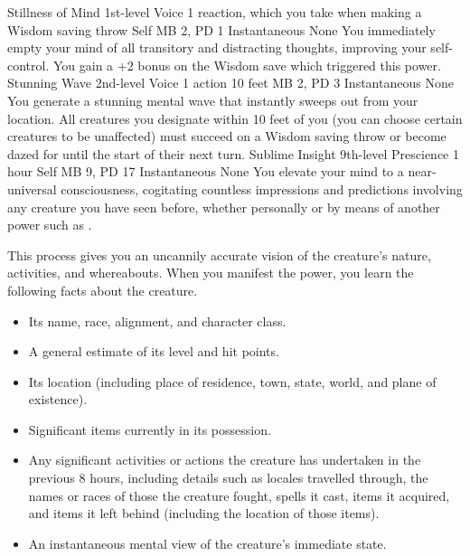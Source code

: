 \DndPowerHeader%
    {Stillness of Mind\label{pwr:stillness-of-mind}}
    {1st-level Voice}
    {1 reaction, which you take when making a Wisdom saving throw}
    {Self}
    {MB 2, PD 1}
    {Instantaneous}
    {None}
You immediately empty your mind of all transitory
and distracting thoughts, improving your self-control. You
gain a +2 bonus on the Wisdom save which triggered this power.
\DndPowerHeader%
    {Stunning Wave\label{pwr:stunning-wave}}
    {2nd-level Voice}
    {1 action}
    {10 feet}
    {MB 2, PD 3}
    {Instantaneous}
    {None}
You generate a stunning mental wave that
instantly sweeps out from your location. All creatures you
designate within 10 feet of you (you can choose certain creatures
to be unaffected) must succeed on a Wisdom saving throw or
become dazed for until the start of their next turn.
\DndPowerHeader%
    {Sublime Insight\label{pwr:sublime-insight}}
    {9th-level Prescience}
    {1 hour}
    {Self}
    {MB 9, PD 17}
    {Instantaneous}
    {None}
You elevate your mind to a
near-universal consciousness,
cogitating countless impressions and predictions
involving any creature you have seen before,
whether personally or by means of another power
such as .

This process gives you an uncannily accurate vision
of the creature's nature,
activities,
and whereabouts.
When you manifest the power,
you learn the following facts about the creature.
\begin{itemize}
\item Its name, race, alignment, and character class.
\item A general estimate of its level and hit points.
\item Its location (including place of residence, town,
      state, world, and plane of existence).
\item Significant items currently in its possession.
\item Any significant activities or actions the creature
      has undertaken in the previous 8 hours,
      including details such as locales travelled through,
      the names or races of those the creature fought,
      spells it cast,
      items it acquired,
      and items it left behind
      (including the location of those items).
\item An instantaneous mental view of the creature's
      immediate state.
\end{itemize}


